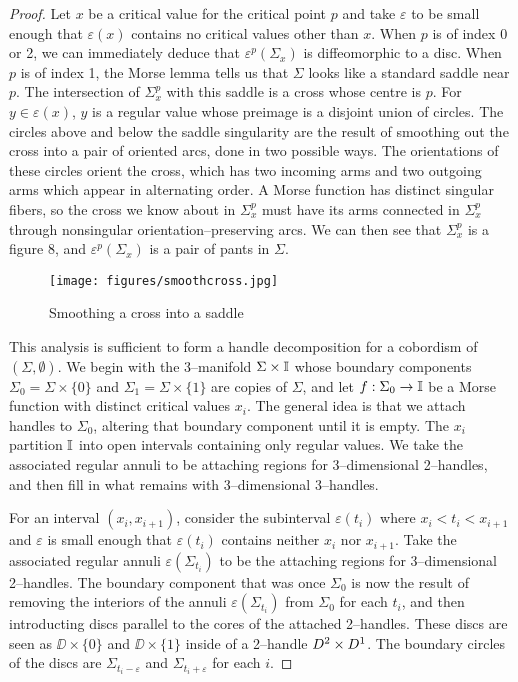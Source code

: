\begin{proof}
	Let $x$ be a critical value for the critical point $p$ and take $\varepsilon$ to be small enough that $\varepsilon(x)$ contains no critical values other than $x$.
	When $p$ is of index 0 or 2, we can immediately deduce that $\varepsilon^p(\Sigma_x)$ is diffeomorphic to a disc.
	When $p$ is of index 1, the Morse lemma tells us that $\Sigma$ looks like a standard saddle near $p$.
	The intersection of $\Sigma_x^p$ with this saddle is a cross whose centre is $p$.
	For $y\in\varepsilon(x)$, $y$ is a regular value whose preimage is a disjoint union of circles.
	The circles above and below the saddle singularity are the result of smoothing out the cross into a pair of oriented arcs, done in two possible ways.
	The orientations of these circles orient the cross, which has two incoming arms and two outgoing arms which appear in alternating order.
	A Morse function has distinct singular fibers, so the cross we know about in $\Sigma_x^p$ must have its arms connected in $\Sigma_x^p$ through nonsingular orientation--preserving arcs.
	We can then see that $\Sigma_x^p$ is a figure 8, and $\varepsilon^p(\Sigma_x)$ is a pair of pants in $\Sigma$.
	

	\begin{figure}
		\centering
		\caption{Smoothing a cross into a saddle}
		\texttt{[image: figures/smoothcross.jpg]}
		\label{fig:smoothcross}
	\end{figure}
	
	This analysis is sufficient to form a handle decomposition for a cobordism of $(\Sigma,\emptyset)$.
	We begin with the 3--manifold $\Sigma\times\mathbb{I}$ whose boundary components $\Sigma_0=\Sigma\times\{0\}$ and $\Sigma_1=\Sigma\times\{1\}$ are copies of $\Sigma$, and let $f:\Sigma_0\to\mathbb{I}$ be a Morse function with distinct critical values $x_i$.
	The general idea is that we attach handles to $\Sigma_0$, altering that boundary component until it is empty.
	The $x_i$ partition $\mathbb{I}$ into open intervals containing only regular values.
	We take the associated regular annuli to be attaching regions for 3--dimensional 2--handles, and then fill in what remains with 3--dimensional 3--handles.
	
	For an interval $(x_i,x_{i+1})$, consider the subinterval $\varepsilon(t_i)$ where $x_i<t_i<x_{i+1}$ and $\varepsilon$ is small enough that $\varepsilon(t_i)$ contains neither $x_i$ nor $x_{i+1}$.
	Take the associated regular annuli $\varepsilon(\Sigma_{t_i})$ to be the attaching regions for 3--dimensional 2--handles.
	The boundary component that was once $\Sigma_0$ is now the result of removing the interiors of the annuli $\varepsilon(\Sigma_{t_i})$ from $\Sigma_0$ for each $t_i$, and then introducting discs parallel to the cores of the attached 2--handles.
	These discs are seen as $\DD\times\{0\}$ and $\DD\times\{1\}$ inside of a 2--handle $D^2\times D^1$.
	The boundary circles of the discs are $\Sigma_{t_i-\varepsilon}$ and $\Sigma_{t_i+\varepsilon}$ for each $i$.
	

\end{proof}
